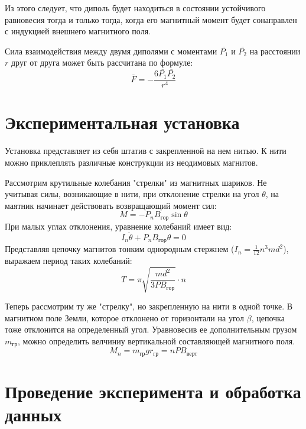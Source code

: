 \documentclass[14pt, a4paper]{report}
\begin{document}
Из этого следует, что диполь будет находиться в состоянии устойчивого равновесия тогда и только тогда, когда его магнитный момент будет сонаправлен с индукцией внешнего магнитного поля.

Сила взаимодействия между двумя диполями с моментами $\overline{P_1}$ и $\overline{P_2}$ на расстоянии $r$ друг от друга может быть рассчитана по формуле:
\[\overline{F}=-\frac{6\overline{P_1}\overline{P_2}}{r^4}\] 

\section{Экспериментальная установка}

Установка представляет из себя штатив с закрепленной на нем нитью. К нити можно приклеплять различные конструкции из неодимовых магнитов.

Рассмотрим крутильные колебания "стрелки" из магнитных шариков. Не учитывая силы, возникающие в нити, при отклонение стрелки на угол $\theta$, на маятник начинает действовать возвращающий момент сил:
\[M=-P_nB_{гор}\sin{\theta}\]
При малых углах отклонения, уравнение колебаний имеет вид:
\[I_n\ddot{\theta}+P_nB_{гор}\theta=0\]
Представляя цепочку магнитов тонким однородным стержнем ($I_n=\frac{1}{12}n^3md^2$), выражаем период таких колебаний:
\[T=\pi\sqrt{\frac{md^2}{3PB_{гор}}}\cdot n\]

Теперь рассмотрим ту же "стрелку", но закрепленную на нити в одной точке. В магнитном поле Земли, которое отклонено от горизонтали на угол $\beta$, цепочка тоже отклонится на определенный угол. Уравновесив ее дополнительным грузом $m_{гр}$, можно определить велчиниу вертикальной составляющей магнитного поля.
\[M_n=m_{гр}gr_{гр}=nPB_{верт}\]

\section{Проведение эксперимента и обработка данных}
\end{document}
